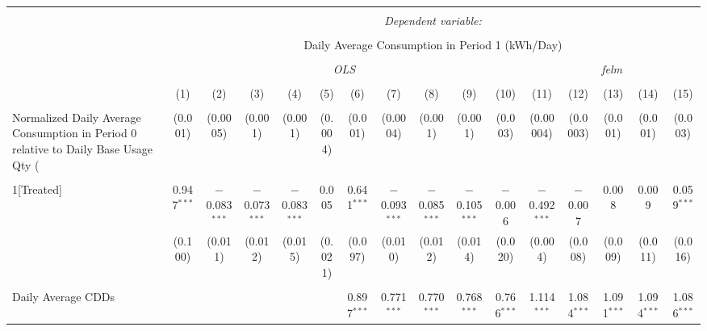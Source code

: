 
\begin{table}[!htbp] \centering 
  \caption{} 
  \label{} 
\small 
\begin{tabular}{@{\extracolsep{5pt}}lccccccccccccccc} 
\\[-1.8ex]\hline 
\hline \\[-1.8ex] 
 & \multicolumn{15}{c}{\textit{Dependent variable:}} \\ 
\cline{2-16} 
\\[-1.8ex] & \multicolumn{15}{c}{Daily Average Consumption in Period 1 (kWh/Day)} \\ 
\\[-1.8ex] & \multicolumn{10}{c}{\textit{OLS}} & \multicolumn{5}{c}{\textit{felm}} \\ 
\\[-1.8ex] & (1) & (2) & (3) & (4) & (5) & (6) & (7) & (8) & (9) & (10) & (11) & (12) & (13) & (14) & (15)\\ 
\hline \\[-1.8ex] 
 Normalized Daily Average Consumption in Period 0 relative to Daily Base Usage Qty (%
  & (0.001) & (0.0005) & (0.001) & (0.001) & (0.004) & (0.001) & (0.0004) & (0.001) & (0.001) & (0.003) & (0.00004) & (0.0003) & (0.001) & (0.001) & (0.003) \\ 
  & & & & & & & & & & & & & & & \\ 
 1[Treated] & 0.947$^{***}$ & $-$0.083$^{***}$ & $-$0.073$^{***}$ & $-$0.083$^{***}$ & 0.005 & 0.641$^{***}$ & $-$0.093$^{***}$ & $-$0.085$^{***}$ & $-$0.105$^{***}$ & $-$0.006 & $-$0.492$^{***}$ & $-$0.007 & 0.008 & 0.009 & 0.059$^{***}$ \\ 
  & (0.100) & (0.011) & (0.012) & (0.015) & (0.021) & (0.097) & (0.010) & (0.012) & (0.014) & (0.020) & (0.004) & (0.008) & (0.009) & (0.011) & (0.016) \\ 
  & & & & & & & & & & & & & & & \\ 
 Daily Average CDDs &  &  &  &  &  & 0.897$^{***}$ & 0.771$^{***}$ & 0.770$^{***}$ & 0.768$^{***}$ & 0.766$^{***}$ & 1.114$^{***}$ & 1.084$^{***}$ & 1.091$^{***}$ & 1.094$^{***}$ & 1.086$^{***}$ \\ 

\end{tabular}
\end{table}
